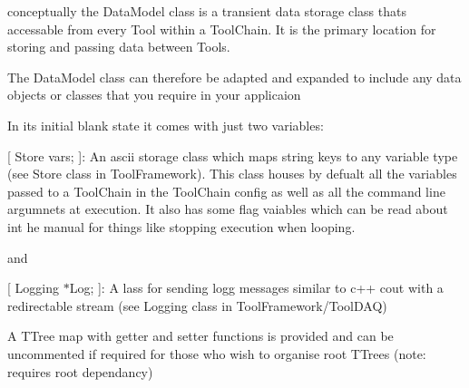 

conceptually the Data\+Model class is a transient data storage class thats accessable from every Tool within a Tool\+Chain. It is the primary location for storing and passing data between Tools.

The Data\+Model class can therefore be adapted and expanded to include any data objects or classes that you require in your applicaion

In it\textquotesingle{}s initial blank state it comes with just two variables\+:

\mbox{[} Store vars; \mbox{]}\+: An ascii storage class which maps string keys to any variable type (see Store class in Tool\+Framework). This class houses by defualt all the variables passed to a Tool\+Chain in the Tool\+Chain config as well as all the command line argumnets at execution. It also has some flag vaiables which can be read about int he manual for things like stopping execution when looping.

and

\mbox{[} Logging $\ast$\+Log; \mbox{]}\+: A lass for sending logg messages similar to c++ cout with a redirectable stream (see Logging class in Tool\+Framework/\+Tool\+DAQ)

A TTree map with getter and setter functions is provided and can be uncommented if required for those who wish to organise root TTrees (note\+: requires root dependancy) 